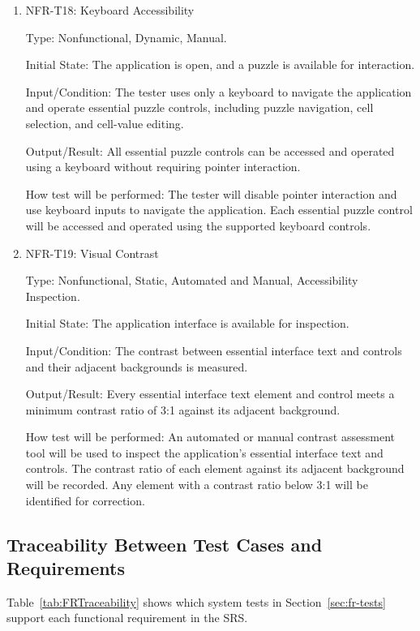 \documentclass[12pt, titlepage]{article}
\begin{document}
\begin{enumerate}

\item{NFR-T18: Keyboard Accessibility\\}

Type: Nonfunctional, Dynamic, Manual.

Initial State: The application is open, and a puzzle is available
for interaction.

Input/Condition: The tester uses only a keyboard to navigate
the application and operate essential puzzle controls, including
puzzle navigation, cell selection, and cell-value editing.

Output/Result: All essential puzzle controls can be accessed
and operated using a keyboard without requiring pointer interaction.

How test will be performed: The tester will disable pointer
interaction and use keyboard inputs to navigate the application.
Each essential puzzle control will be accessed and operated
using the supported keyboard controls. 

\item{NFR-T19: Visual Contrast\\}

Type: Nonfunctional, Static, Automated and Manual, Accessibility
Inspection.

Initial State: The application interface is available for
inspection.

Input/Condition: The contrast between essential interface text
and controls and their adjacent backgrounds is measured.

Output/Result: Every essential interface text element and control
meets a minimum contrast ratio of 3:1 against its adjacent
background.

How test will be performed: An automated or manual contrast
assessment tool will be used to inspect the application's
essential interface text and controls. The contrast ratio
of each element against its adjacent background will be recorded.
Any element with a contrast ratio below 3:1 will be identified
for correction.

\end{enumerate}

\subsection{Traceability Between Test Cases and Requirements}
\label{sec:fr-trace}

Table~\ref{tab:FRTraceability} shows which system tests in Section~\ref{sec:fr-tests} support each functional requirement in the SRS.
\end{document}
